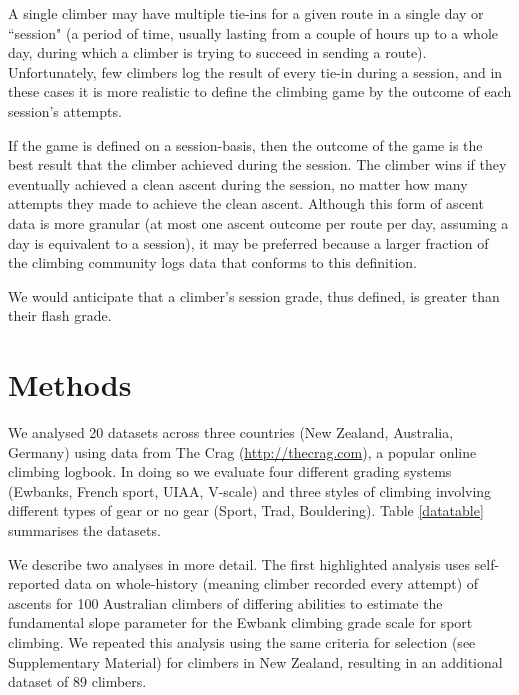 \documentclass[12pt]{article}
\begin{document}
A single climber may have multiple tie-ins for a given route in a single day or ``session" (a period of time, usually lasting from a couple of hours up to a whole day, during which a climber is trying to succeed in sending a route).  Unfortunately, few climbers log the result of every tie-in during a session, and in these cases it is more realistic to define the climbing game by the outcome of each session's attempts.

If the game is defined on a session-basis, then the outcome of the game is the best result that the climber achieved during the session. The climber wins if they eventually achieved a clean ascent during the session, no matter how many attempts they made to achieve the clean ascent. Although this form of ascent data is more granular (at most one ascent outcome per route per day, assuming a day is equivalent to a session), it may be preferred because a larger fraction of the climbing community logs data that conforms to this definition.

We would anticipate that a climber's session grade, thus defined, is greater than their flash grade.

\section{Methods}

We analysed 20 datasets across three countries (New Zealand, Australia, Germany) using data from The Crag (\url{http://thecrag.com}), a popular online climbing logbook. In doing so we evaluate four different grading systems (Ewbanks, French sport, UIAA, V-scale) and three styles of climbing involving different types of gear or no gear (Sport, Trad, Bouldering). Table \ref{datatable} summarises the datasets.


\afterpage{%
    \clearpage%
    \thispagestyle{empty}%
    \begin{landscape}%
       
    \end{landscape}
    \clearpage%
}


We describe two analyses in more detail. The first highlighted analysis uses self-reported data on whole-history (meaning climber recorded every attempt) of ascents for 100 Australian climbers of differing abilities to estimate the fundamental slope parameter for the Ewbank climbing grade scale for sport climbing. We repeated this analysis using the same criteria for selection (see Supplementary Material) for climbers in New Zealand, resulting in an additional dataset of 89 climbers.
\end{document}

